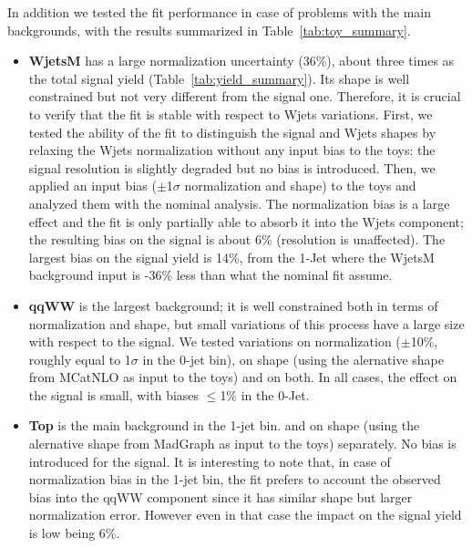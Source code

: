 In addition we tested the fit performance in case of problems with the main backgrounds, with the results summarized 
in Table~\ref{tab:toy_summary}.
\begin{itemize}

\item {\bf WjetsM} has a large normalization uncertainty (36\%), about three times as the total signal yield (Table~\ref{tab:yield_summary}). 
Its shape is well constrained but not very different from the signal one. 
Therefore, it is crucial to verify that the fit is stable with respect to Wjets variations.
First, we tested the ability of the fit to distinguish the signal and Wjets shapes by relaxing the Wjets normalization without any input bias to the toys: the signal resolution is slightly degraded but no bias is introduced. 
Then, we applied an input bias ($\pm$1$\sigma$ normalization and shape) to the toys and analyzed them with the nominal analysis. 
The normalization bias is a large effect and the fit is only partially able to absorb it into the Wjets component; 
the resulting bias on the signal is about 6\% (resolution is unaffected). 
The largest bias on the signal yield is 14\%, from the 1-Jet where the WjetsM background input is -36\% less than what 
the nominal fit assume.

\item {\bf qqWW} is the largest background; it is well constrained both in terms of normalization and shape, but small variations of this 
process have a large size with respect to the signal. 
We tested variations on normalization ($\pm$10\%, roughly equal to 1$\sigma$ in the 0-jet bin), 
on shape (using the alernative shape from MCatNLO as input to the toys) and on both. 
In all cases, the effect on the signal is small, with biases $\leq$1\% in the 0-Jet.  

\item {\bf Top} is the main background in the 1-jet bin. 
and on shape 
(using the alernative shape from MadGraph as input to the toys) separately. No bias is introduced for the signal. 
It is interesting to note that, in case of normalization bias in the 1-jet bin, the fit prefers to account the observed bias 
into the qqWW component since it has similar shape but larger normalization error. However even in that case the impact 
on the signal yield is low being 6\%. 
\end{itemize}

